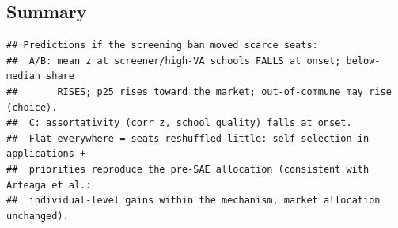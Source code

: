 \documentclass[
]{article}
\begin{document}
\hypertarget{summary}{%
\subsection{Summary}\label{summary}}

\begin{verbatim}
## Predictions if the screening ban moved scarce seats:
##  A/B: mean z at screener/high-VA schools FALLS at onset; below-median share
##       RISES; p25 rises toward the market; out-of-commune may rise (choice).
##  C: assortativity (corr z, school quality) falls at onset.
##  Flat everywhere = seats reshuffled little: self-selection in applications +
##  priorities reproduce the pre-SAE allocation (consistent with Arteaga et al.:
##  individual-level gains within the mechanism, market allocation unchanged).
\end{verbatim}
\end{document}
